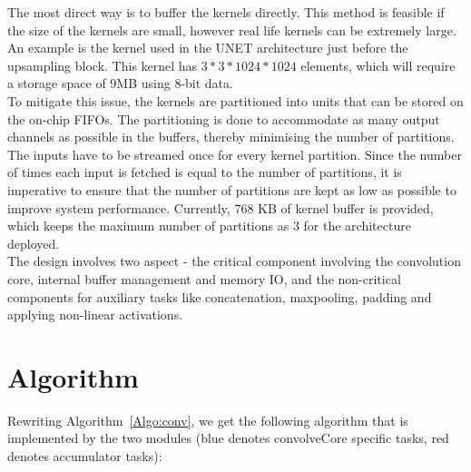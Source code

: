 \documentclass[a4paper,12pt, final]{report}
\begin{document}
The most direct way is to buffer the kernels directly. This method is feasible if the size of the kernels are small, however real life kernels can be extremely large. An example is the kernel used in the UNET architecture just before the upsampling block. This kernel has $3*3*1024*1024$ elements, which will require a storage space of 9MB using 8-bit data.
\\

To mitigate this issue, the kernels are partitioned into units that can be stored on the on-chip FIFOs. The partitioning is done to accommodate as many output channels as possible in the buffers, thereby minimising the number of partitions. The inputs have to be streamed once for every kernel partition. Since the number of times each input is fetched is equal to the number of partitions, it is imperative to ensure that the number of partitions are kept as low as possible to improve system performance. Currently, 768 KB of kernel buffer is provided, which keeps the maximum number of partitions as 3 for the architecture deployed.
\\

The design involves two aspect - the critical component involving the convolution core, internal buffer management and memory IO, and the non-critical components for auxiliary tasks like concatenation, maxpooling, padding and applying non-linear activations.
\\

\section{Algorithm}

Rewriting Algorithm~\ref{Algo:conv}, we get the following algorithm that is implemented by the two modules (blue denotes convolveCore specific tasks, red denotes accumulator tasks):
\end{document}
